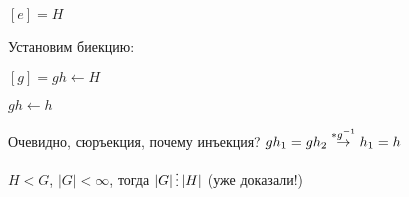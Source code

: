 \documentclass[main]{subfiles}
\begin{document}
  \begin{utv}
      $[e]=H$

      Установим биекцию:

      $[g]=gh \leftarrow H$

      $gh \leftarrow h$

      Очевидно, сюръекция, почему инъекция? $g h_1 = g h_2 \overset{*g^{-1}}{\rightarrow} h_1 = h$
  \end{utv}

  \begin{theorem}[Лагранжа]
  $H < G$, $|G| < \infty$, тогда $|G| \devides |H|$ (уже доказали!)
  \end{theorem}
\end{document}
